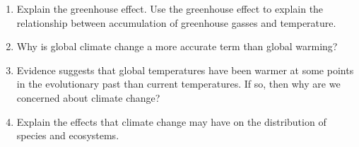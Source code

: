 \documentclass[letterpaper]{tufte-handout}
\begin{document}
\begin{enumerate}





	\item Explain the greenhouse effect. Use the greenhouse effect to explain the relationship between accumulation of greenhouse gasses and temperature.
	
	\item Why is global climate change a more accurate term than global warming?
	
	\item Evidence suggests that global temperatures have been warmer at some points in the evolutionary past than current temperatures. If so, then why are we concerned about climate change?
	
	\item Explain the effects that climate change may have on the distribution of species and ecosystems.

\end{enumerate}
\end{document}

